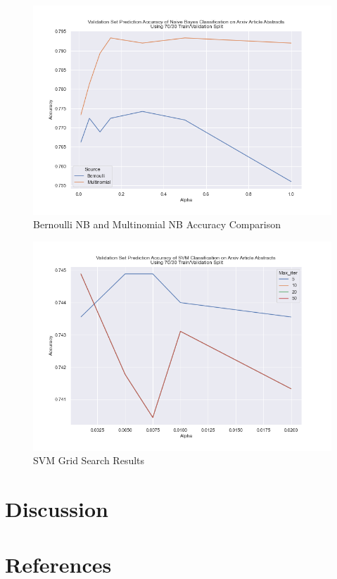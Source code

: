 \documentclass[a4paper,12pt]{article}
\begin{document}
\begin{figure}[H]
    \centering
    \caption{Bernoulli NB and Multinomial NB Accuracy Comparison}
    \includegraphics[width=12cm]{compare.png}    
\end{figure}

\begin{figure}[H]
    \centering
    \caption{SVM Grid Search Results}
    \includegraphics[width=12cm]{compareSVM.png}    
\end{figure}

\section{Discussion}



\section{References}
\end{document}
